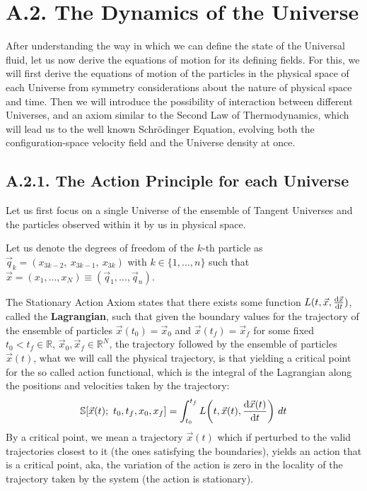 \documentclass[11pt, a4paper]{article} %
\newcommand{\R}{\mathbb{R}} %
\newcommand{\s}{\mathbb{S}}
\begin{document}
\newpage
{}
\section*{A.2. The Dynamics of the Universe}

After understanding the way in which we can define the state of the Universal fluid, let us now derive the equations of motion for its defining fields. For this, we will first derive the equations of motion of the particles in the physical space of each Universe from symmetry considerations about the nature of physical space and time. Then we will introduce the possibility of interaction between different Universes, and an axiom similar to the Second Law of Thermodynamics, which will lead us to the well known Schrödinger Equation, evolving both the configuration-space velocity field and the Universe density at once.

\subsection*{A.2.1. The Action Principle for each Universe}


Let us first focus on a single Universe of the ensemble of Tangent Universes and the particles observed within it by us in physical space.

Let us denote the degrees of freedom of the $k$-th particle as $\vec{q}_k=(x_{3k-2},\ x_{3k-1},\ x_{3k} )$ with $k\in\{1,...,n\}$ such that $\vec{x}=(x_1,...,x_N)\equiv (\vec{q}_{1},...,\vec{q}_n)$.

The Stationary Action Axiom states that there exists some function $L(t, \vec{x}, \dv{\vec{x}}{t})$, called the {\bf Lagrangian}, such that given the boundary values for the trajectory of the ensemble of particles $\vec{x}(t_0)=\vec{x}_0$ and $\vec{x}(t_f)=\vec{x}_f$ for some fixed $t_0<t_f\in\R$, $\vec{x}_0, \vec{x}_f\in\R^N$, the trajectory followed by the ensemble of particles $\vec{x}(t)$, what we will call the physical trajectory, is that yielding a critical point for the so called action functional, which is the integral of the Lagrangian along the positions and velocities taken by the trajectory:
\begin{equation}
\s\qty[\vec{x}(t);\ t_0,t_f,x_0, x_f] = \int_{t_0}^{t_f} L\qty(t, \vec{x}(t),\dv{\vec{x}(t)}{t}(t))\ dt
\end{equation}
By a critical point, we mean a trajectory $\vec{x}(t)$ which if perturbed to the valid trajectories closest to it (the ones satisfying the boundaries), yields an action that is a critical point, aka, the variation of the action is zero in the locality of the trajectory taken by the system (the action is stationary).
\end{document}
